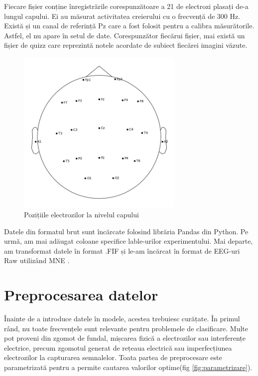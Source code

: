 Fiecare fișier conține înregistrările corespunzătoare a 21 de electrozi plasați de-a lungul capului. 
Ei au măsurat activitatea creierului cu o frecvență de 300 Hz. 
Există și un canal de referință Pz care a fost folosit pentru a calibra măsurătorile. 
Astfel, el nu apare în setul de date. 
Corespunzător fiecărui fișier, mai există un fișier de quizz care reprezintă notele acordate de subiect fiecărei imagini văzute. 

\setlength{\abovecaptionskip}{0pt}
\setlength{\belowcaptionskip}{0pt}
\begin{figure}[h]
    \centering
    \includegraphics[width=8cm]{images/Sensor_positions_(eeg).png}
    \caption{Pozițiile electrozilor la nivelul capului}
    \label{fig:sensor_positions}
\end{figure}
Datele din formatul brut sunt încărcate folosind librăria Pandas \cite{reback2020pandas} din Python. Pe urmă, am mai adăugat coloane specifice lable-urilor experimentului. Mai departe, am transformat datele în format .FIF și le-am încărcat în format de EEG-uri Raw utilizând MNE \cite{MNE}.

\section{Preprocesarea datelor}
Înainte de a introduce datele în modele, acestea trebuiesc curățate. În primul rând, nu toate frecvențele sunt relevante pentru problemele de clasificare. Multe pot proveni din zgomot de fundal, mișcarea fizică a electrozilor sau interferențe electrice, precum zgomotul generat de rețeaua electrică sau imperfecțiunea electrozilor la capturarea semnalelor. Toata partea de preprocesare este parametrizată pentru a permite cautarea valorilor optime(fig \ref{fig:parametrizare}).

